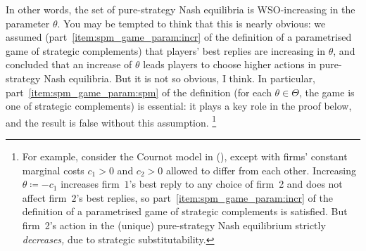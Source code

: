 In other words, the set of pure-strategy Nash equilibria is WSO-increasing in the parameter $\theta$. You may be tempted to think that this is nearly obvious: we assumed (part~\ref{item:spm_game_param:incr} of the definition of a parametrised game of strategic complements) that players' best replies are increasing in $\theta$, and concluded that an increase of $\theta$ leads players to choose higher actions in pure-strategy Nash equilibria. But it is not so obvious, I think. In particular, part~\ref{item:spm_game_param:spm} of the definition (for each $\theta \in \Theta$, the game is one of strategic complements) is essential: it plays a key role in the proof below, and the result is false without this assumption.%
	\footnote{For example, consider the Cournot model in  (), except with firms' constant marginal costs $c_1>0$ and $c_2>0$ allowed to differ from each other. Increasing $\theta \coloneqq -c_1$ increases firm~$1$'s best reply to any choice of firm~2 and does not affect firm~$2$'s best replies, so part~\ref{item:spm_game_param:incr} of the definition of a parametrised game of strategic complements is satisfied. But firm~2's action in the (unique) pure-strategy Nash equilibrium strictly \emph{decreases,} due to strategic substitutability.}


